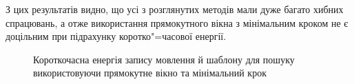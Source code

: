             З цих результатів видно, що усі з розглянутих методів мали дуже багато хибних спрацювань,
            а отже використання прямокутного вікна з мінімальним кроком не є доцільним при підрахунку коротко"=часової
            енергії.

            \begin{figure}[h]
                \centering

                \caption{Короткочасна енергія запису мовлення й шаблону для пошуку використовуючи прямокутне вікно та
                    мінімальний крок}
                \label{fig:audio-energy-rect-min}
            \end{figure}

